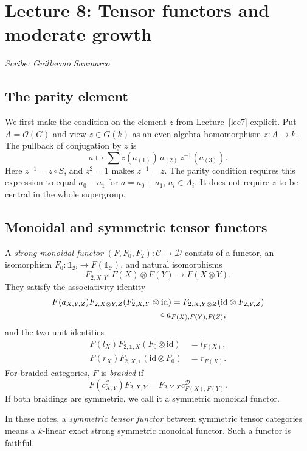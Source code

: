 \section{Lecture 8: Tensor functors and moderate growth}\label{lec8}
\noindent\textit{Scribe: Guillermo Sanmarco}


\subsection*{The parity element}
We first make the condition on the element $z$ from Lecture~\ref{lec7} explicit. Put $A=\mathcal O(G)$ and view $z\in G(k)$ as an even algebra homomorphism $z:A\to k$. The pullback of conjugation by $z$ is
\[
 a\longmapsto\sum z(a_{(1)})\,a_{(2)}\,z^{-1}(a_{(3)}).
\]
Here $z^{-1}=z\circ S$, and $z^2=1$ makes $z^{-1}=z$. The parity condition requires this expression to equal $a_0-a_1$ for $a=a_0+a_1$, $a_i\in A_i$. It does not require $z$ to be central in the whole supergroup.

\subsection*{Monoidal and symmetric tensor functors}
\begin{definition}
A \emph{strong monoidal functor} $(F,F_0,F_2):\mathcal C\to\mathcal D$ consists of a functor, an isomorphism $F_0:\mathbb{1}_{\mathcal D}\to F(\mathbb{1}_{\mathcal C})$, and natural isomorphisms
\[
 F_{2,X,Y}:F(X)\otimes F(Y)\longrightarrow F(X\otimes Y).
\]
They satisfy the associativity identity
\[
\begin{split}
 F(a_{X,Y,Z})F_{2,X\otimes Y,Z}(F_{2,X,Y}\otimes\mathrm{id})
 ={}&F_{2,X,Y\otimes Z}(\mathrm{id}\otimes F_{2,Y,Z})\\
 &\hspace{-10mm}\circ a_{F(X),F(Y),F(Z)},
\end{split}
\]
and the two unit identities
\[
\begin{split}
 F(l_X)F_{2,\mathbb{1},X}(F_0\otimes\mathrm{id})&=l_{F(X)},\\
 F(r_X)F_{2,X,\mathbb{1}}(\mathrm{id}\otimes F_0)&=r_{F(X)}.
\end{split}
\]
For braided categories, $F$ is \emph{braided} if
\[
 F(c^{\mathcal C}_{X,Y})F_{2,X,Y}
 =F_{2,Y,X}c^{\mathcal D}_{F(X),F(Y)}.
\]
If both braidings are symmetric, we call it a symmetric monoidal functor.
\end{definition}
In these notes, a \emph{symmetric tensor functor} between symmetric tensor categories means a $k$-linear exact strong symmetric monoidal functor. Such a functor is faithful.


